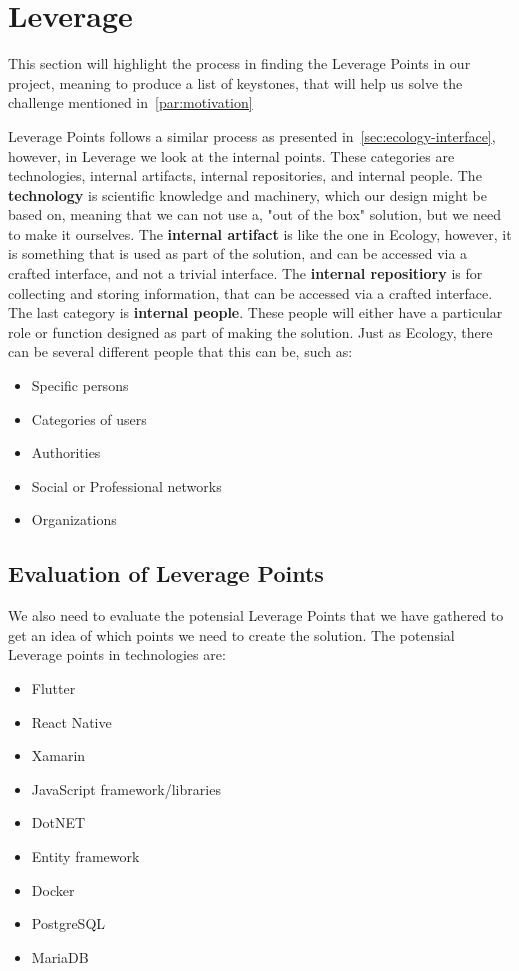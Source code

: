 \section{Leverage}
This section will highlight the process in finding the Leverage Points in our project, meaning to produce a list of keystones, that will help us solve the challenge mentioned in~\autoref{par:motivation}

Leverage Points follows a similar process as presented in~\autoref{sec:ecology-interface}, however, in Leverage we look at the internal points.
These categories are technologies, internal artifacts, internal repositories, and internal people.
The \textbf{technology} is scientific knowledge and machinery, which our design might be based on, meaning that we can not use a, "out of the box" solution, but we need to make it ourselves.
The \textbf{internal artifact} is like the one in Ecology, however, it is something that is used as part of the solution, and can be accessed via a crafted interface, and not a trivial interface.
The \textbf{internal repositiory} is for collecting and storing information, that can be accessed via a crafted interface.
The last category is \textbf{internal people}.
These people will either have a particular role or function designed as part of making the solution.
Just as Ecology, there can be several different people that this can be, such as:

\begin{itemize}
    \item Specific persons
    \item Categories of users
    \item Authorities
    \item Social or Professional networks
    \item Organizations
\end{itemize}

\subsection{Evaluation of Leverage Points}
We also need to evaluate the potensial Leverage Points that we have gathered to get an idea of which points we need to create the solution.
The potensial Leverage points in technologies are:

\begin{itemize}
    \item Flutter
    \item React Native
    \item Xamarin
    \item JavaScript framework/libraries
    \item DotNET
    \item Entity framework
    \item Docker
    \item PostgreSQL
    \item MariaDB
\end{itemize}

